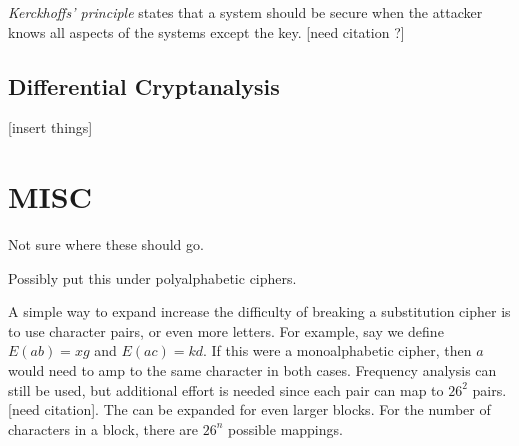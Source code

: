 \documentclass[12pt]{article}
\begin{document}
\textit{Kerckhoffs' principle} states that a system should be secure when the attacker knows all aspects of the systems except the key. [need citation ?]
\subsection{Differential Cryptanalysis}

[insert things]

\section{MISC}
Not sure where these should go.

Possibly put this under polyalphabetic ciphers.

A simple way to expand increase the difficulty of breaking a substitution cipher is to use character pairs, or even more letters. For example, say we define $E(ab)=xg$ and $E(ac)=kd$. If this were a monoalphabetic cipher, then $a$ would need to amp to the same character in both cases. Frequency analysis can still be used, but additional effort is needed since each pair can map to $26^2$ pairs. [need citation]. The can be expanded for even larger blocks. For the number of characters in a block, there are $26^n$ possible mappings.

\newpage

\end{document}
